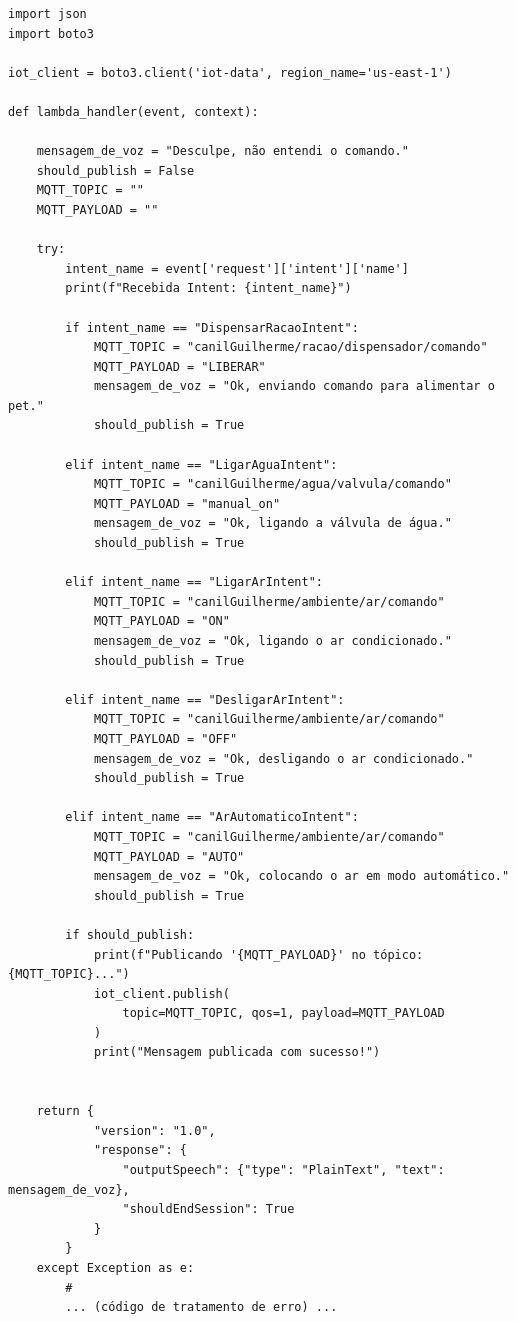 

\begin{lstlisting}
import json
import boto3

iot_client = boto3.client('iot-data', region_name='us-east-1')

def lambda_handler(event, context):
    
    mensagem_de_voz = "Desculpe, não entendi o comando."
    should_publish = False 
    MQTT_TOPIC = ""
    MQTT_PAYLOAD = ""

    try:
        intent_name = event['request']['intent']['name']
        print(f"Recebida Intent: {intent_name}")

        if intent_name == "DispensarRacaoIntent":
            MQTT_TOPIC = "canilGuilherme/racao/dispensador/comando"
            MQTT_PAYLOAD = "LIBERAR"
            mensagem_de_voz = "Ok, enviando comando para alimentar o pet."
            should_publish = True
        
        elif intent_name == "LigarAguaIntent":
            MQTT_TOPIC = "canilGuilherme/agua/valvula/comando"
            MQTT_PAYLOAD = "manual_on"
            mensagem_de_voz = "Ok, ligando a válvula de água."
            should_publish = True

        elif intent_name == "LigarArIntent":
            MQTT_TOPIC = "canilGuilherme/ambiente/ar/comando"
            MQTT_PAYLOAD = "ON"
            mensagem_de_voz = "Ok, ligando o ar condicionado."
            should_publish = True
            
        elif intent_name == "DesligarArIntent":
            MQTT_TOPIC = "canilGuilherme/ambiente/ar/comando"
            MQTT_PAYLOAD = "OFF"
            mensagem_de_voz = "Ok, desligando o ar condicionado."
            should_publish = True
            
        elif intent_name == "ArAutomaticoIntent":
            MQTT_TOPIC = "canilGuilherme/ambiente/ar/comando"
            MQTT_PAYLOAD = "AUTO"
            mensagem_de_voz = "Ok, colocando o ar em modo automático."
            should_publish = True

        if should_publish:
            print(f"Publicando '{MQTT_PAYLOAD}' no tópico: {MQTT_TOPIC}...")
            iot_client.publish(
                topic=MQTT_TOPIC, qos=1, payload=MQTT_PAYLOAD
            )
            print("Mensagem publicada com sucesso!")
        
        
    return {
            "version": "1.0",
            "response": {
                "outputSpeech": {"type": "PlainText", "text": mensagem_de_voz},
                "shouldEndSession": True
            }
        }
    except Exception as e:
        # 
        ... (código de tratamento de erro) ...
\end{lstlisting}

